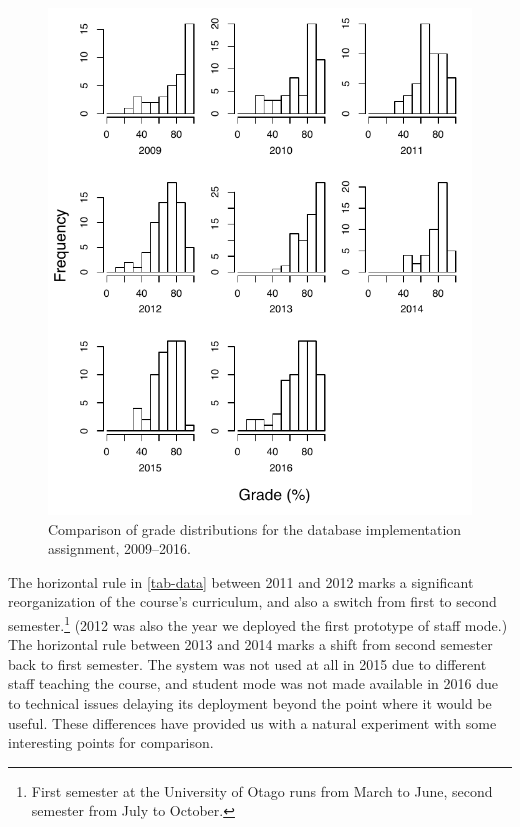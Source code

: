 \documentclass[sigconf, authordraft, capitalise]{acmart}
\begin{document}
\begin{figure}
    \includegraphics[width=\columnwidth,keepaspectratio]{grades_all_years.pdf}
    \caption{Comparison of grade distributions for the database implementation assignment, 2009--2016.}
    \label{fig-distributions}
\end{figure}


The horizontal rule in \cref{tab-data} between 2011 and 2012 marks a significant reorganization of the course's curriculum, and also a switch from first to second semester.\footnote{First semester at the University of Otago runs from March to June, second semester from July to October.} (2012 was also the year we deployed the first prototype of staff mode.) The horizontal rule between 2013 and 2014 marks a shift from second semester back to first semester. The system was not used at all in 2015 due to different staff teaching the course, and student mode was not made available in 2016 due to technical issues delaying its deployment beyond the point where it would be useful. These differences have provided us with a natural experiment with some interesting points for comparison.
\end{document}
